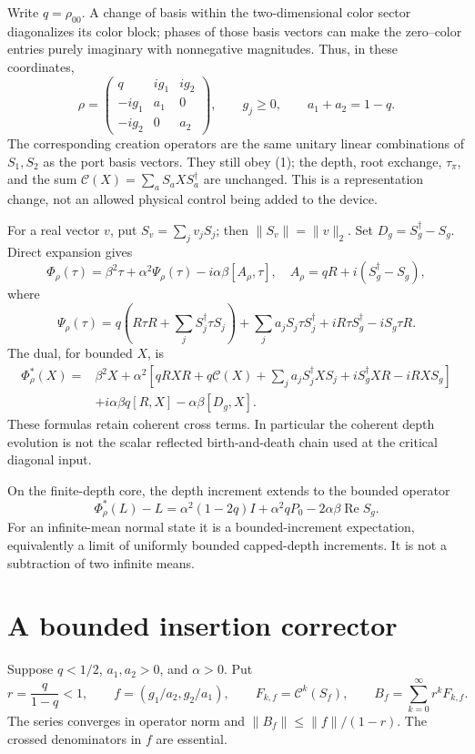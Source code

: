 \documentclass[11pt]{article}
\newcommand{\Reop}{\operatorname{Re}}
\begin{document}
Write $q=\rho_{00}$. A change of basis within the two-dimensional color
sector diagonalizes its color block; phases of those basis vectors can make
the zero--color entries purely imaginary with nonnegative magnitudes. Thus,
in these coordinates,
\[
 \rho=
 \begin{pmatrix}
 q&ig_1&ig_2\\
 -ig_1&a_1&0\\
 -ig_2&0&a_2
 \end{pmatrix},
 \qquad g_j\ge0,\qquad a_1+a_2=1-q.
 \tag{3}
\]
The corresponding creation operators are the same unitary linear
combinations of $S_1,S_2$ as the port basis vectors. They still obey (1);
the depth, root exchange, $\tau_\pi$, and the sum
$\mathcal C(X)=\sum_aS_aXS_a^\dagger$ are unchanged. This is a representation
change, not an allowed physical control being added to the device.

For a real vector $v$, put $S_v=\sum_jv_jS_j$; then $\|S_v\|=\|v\|_2$.
Set $D_g=S_g^\dagger-S_g$. Direct expansion gives
\[
 \Phi_\rho(\tau)=\beta^2\tau+\alpha^2\Psi_\rho(\tau)
                  -i\alpha\beta[A_\rho,\tau],
 \quad
 A_\rho=qR+i(S_g^\dagger-S_g),
 \tag{4}
\]
where
\[
 \Psi_\rho(\tau)
 =q\left(R\tau R+\sum_jS_j^\dagger\tau S_j\right)
  +\sum_j a_jS_j\tau S_j^\dagger
  +iR\tau S_g^\dagger-iS_g\tau R.
 \tag{5}
\]
The dual, for bounded $X$, is
\[
\begin{split}
 \Phi_\rho^*(X)={}&\beta^2X+
 \alpha^2\left[qRXR+q\mathcal C(X)+
    \sum_j a_jS_j^\dagger XS_j
    +iS_g^\dagger XR-iRXS_g\right]\\
 &+i\alpha\beta q[R,X]-\alpha\beta[D_g,X].
\end{split}
 \tag{6}
\]
These formulas retain coherent cross terms. In particular the
coherent depth evolution is not the scalar reflected birth-and-death chain
used at the critical diagonal input.

On the finite-depth core, the depth increment extends to the bounded operator
\[
 \Phi_\rho^*(L)-L
 =\alpha^2(1-2q)I+\alpha^2qP_0
       -2\alpha\beta\Reop S_g.
 \tag{7}
\]
For an infinite-mean normal state it is a bounded-increment expectation,
equivalently a limit of uniformly bounded capped-depth increments.
It is not a subtraction of two infinite means.

\section{A bounded insertion corrector}\label{sec:corrector}

Suppose $q<1/2$, $a_1,a_2>0$, and $\alpha>0$. Put
\[
 r=\frac q{1-q}<1,\qquad f=(g_1/a_2,g_2/a_1),\qquad
 F_{k,f}=\mathcal C^k(S_f),\qquad
 B_f=\sum_{k=0}^\infty r^kF_{k,f}.
 \tag{8}
\]
The series converges in operator norm and
$\|B_f\|\le\|f\|/(1-r)$. The crossed denominators in $f$ are essential.
\end{document}
